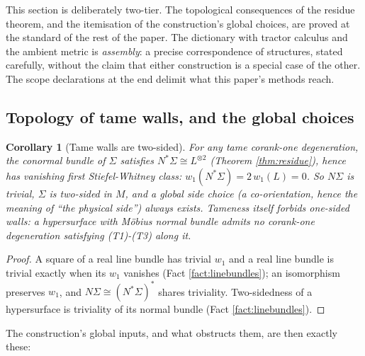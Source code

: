 \documentclass[11pt]{article}
\newtheorem{corollary}[theorem]{Corollary}
\theoremstyle{definition}
\newcommand{\shL}{L}
\newcommand{\Sig}{\Sigma}
\begin{document}
This section is deliberately two-tier. The topological consequences of the residue theorem, and the itemisation of the construction's global choices, are proved at the standard of the rest of the paper. The dictionary with tractor calculus and the ambient metric is \emph{assembly}: a precise correspondence of structures, stated carefully, without the claim that either construction is a special case of the other. The scope declarations at the end delimit what this paper's methods reach.

\subsection{Topology of tame walls, and the global choices}\label{subsec:choices}

\begin{corollary}[Tame walls are two-sided]\label{cor:twosided}
For any tame corank-one degeneration, the conormal bundle of $\Sig$ satisfies $N^*\Sig \cong \shL^{\otimes 2}$ (Theorem \ref{thm:residue}), hence has vanishing first Stiefel-Whitney class: $w_1(N^*\Sig) = 2\,w_1(\shL) = 0$. So $N\Sig$ is trivial, $\Sig$ is two-sided in $M$, and a global side choice (a co-orientation, hence the meaning of ``the physical side'') always exists. Tameness itself forbids one-sided walls: a hypersurface with M\"obius normal bundle admits no corank-one degeneration satisfying (T1)-(T3) along it.
\end{corollary}

\begin{proof}
A square of a real line bundle has trivial $w_1$ and a real line bundle is trivial exactly when its $w_1$ vanishes (Fact \ref{fact:linebundles}); an isomorphism preserves $w_1$, and $N\Sig \cong (N^*\Sig)^*$ shares triviality. Two-sidedness of a hypersurface is triviality of its normal bundle (Fact \ref{fact:linebundles}).
\end{proof}

The construction's global inputs, and what obstructs them, are then exactly these:
\end{document}
